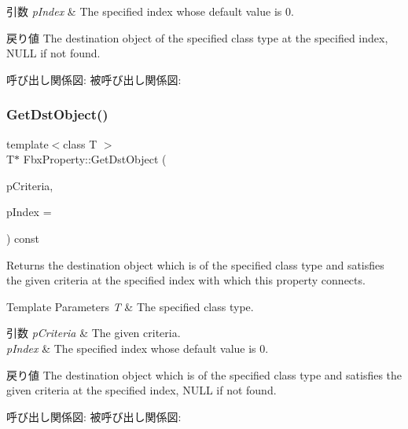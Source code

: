 \begin{DoxyParams}{引数}
{\em p\+Index} & The specified index whose default value is 0. \\
\hline
\end{DoxyParams}
\begin{DoxyReturn}{戻り値}
The destination object of the specified class type at the specified index, N\+U\+LL if not found. 
\end{DoxyReturn}
呼び出し関係図\+:
被呼び出し関係図\+:
\mbox{\label{class_fbx_property_af7d61576c53b6b0d1dbf0f0d0a27ad3d}} 
\subsubsection{\texorpdfstring{Get\+Dst\+Object()}{GetDstObject()}\hspace{0.1cm}{\footnotesize\ttfamily [4/4]}}
{\footnotesize\ttfamily template$<$class T $>$ \\
T$\ast$ Fbx\+Property\+::\+Get\+Dst\+Object (\begin{DoxyParamCaption}\item[{const \hyperlink{class_fbx_criteria}{Fbx\+Criteria} \&}]{p\+Criteria,  }\item[{const int}]{p\+Index = {} }\end{DoxyParamCaption}) const}

Returns the destination object which is of the specified class type and satisfies the given criteria at the specified index with which this property connects. 
\begin{DoxyTemplParams}{Template Parameters}
{\em T} & The specified class type. \\
\hline
\end{DoxyTemplParams}

\begin{DoxyParams}{引数}
{\em p\+Criteria} & The given criteria. \\
\hline
{\em p\+Index} & The specified index whose default value is 0. \\
\hline
\end{DoxyParams}
\begin{DoxyReturn}{戻り値}
The destination object which is of the specified class type and satisfies the given criteria at the specified index, N\+U\+LL if not found. 
\end{DoxyReturn}
呼び出し関係図\+:
被呼び出し関係図\+:
\mbox{\label{class_fbx_property_a8a87e8b905f4a30eac5d382fa6b95dbc}} 
